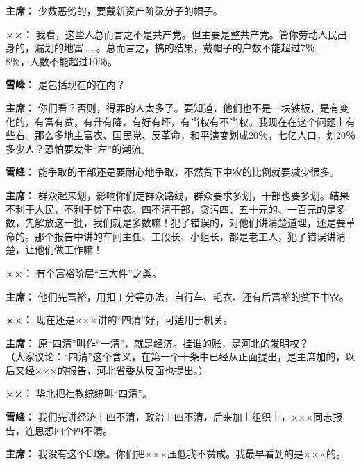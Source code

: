 \begin{list}{}
\item[\textbf{主席：}] 少数恶劣的，要戴新资产阶级分子的帽子。

\item[\textbf{××：}] 我看，这些人总而言之不是共产党。但主要是整共产党。管你劳动人民出身的，漏划的地富……。总而言之，搞的结果，戴帽子的户数不能超过7％——8％，人数不能超过10％。

\item[\textbf{雪峰：}] 是包括现在的在内？

\item[\textbf{主席：}] 你们看？否则，得罪的人太多了。要知道，他们也不是一块铁板，是有变化的，有富有贫，有升有降，有好有坏，有当权有不当权。我现在在这个问题上有些右。那么多地主富农、国民党、反革命，和平演变划成20％，七亿人口，划20％多少人？恐怕要发生“左”的潮流。

\item[\textbf{雪峰：}] 能争取的干部还是要耐心地争取，不然贫下中农的比例就要减少很多。

\item[\textbf{主席：}] 群众起来划，影响你们走群众路线，群众要求多划，干部也要多划。结果不利于人民，不利于贫下中农。四不清干部，贪污四、五十元的、一百元的是多数，先解放这一批，我们就是多数嘛！犯了错误的，对他们讲清楚道理，还是要革命的。那个报告中讲的车间主任、工段长、小组长，都是老工人，犯了错误讲清楚，让他们做工作嘛！

\item[\textbf{××：}] 有个富裕阶层“三大件”之类。

\item[\textbf{主席：}] 他们先富裕，用扣工分等办法，自行车、毛衣、还有后富裕的贫下中农。

\item[\textbf{××：}] 现在还是×××讲的“四清”好，可适用于机关。

\item[\textbf{主席：}] 原“四清”叫作“一清”，就是经济。挂谁的账，是河北的发明权？\\
（大家议论：“四清”这个含义，在第一个十条中已经从正面提出，是主席加的，以后又经×××的报告，河北省委从反面也提出。）

\item[\textbf{××：}] 华北把社教统统叫“四清”。

\item[\textbf{雪峰：}] 我们先讲经济上四不清，政治上四不清，后来加上组织上，×××同志报告，连思想四个四不清。

\item[\textbf{主席：}] 我没有这个印象。你们把×××压低我不赞成。我最早看到的是×××的。


\end{list}
